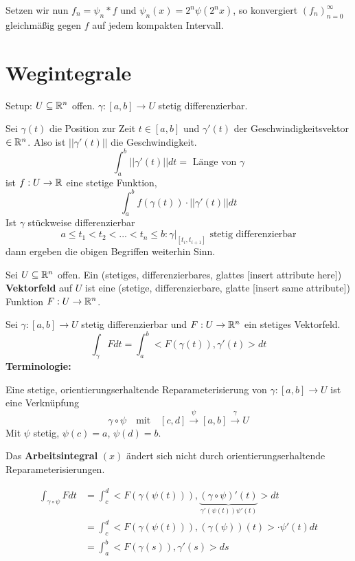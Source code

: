 \documentclass[main.tex]{subfiles}
\begin{document}
Setzen wir nun $f_n = \psi_n * f$ und $\psi_n(x) = 2^n \psi(2^n x)$, so konvergiert $(f_n)_{n = 0}^\infty$ gleichmäßig gegen $f$ auf jedem kompakten Intervall.


\section{Wegintegrale}
Setup: $U \subseteq \mathbb{R}^n$ offen. $\gamma : [a,b] \to U$ stetig differenzierbar.

Sei $\gamma(t)$ die Position zur Zeit $t \in [a,b]$ und $\gamma'(t)$ der Geschwindigkeitsvektor $\in \mathbb{R}^n$. Also ist $||\gamma'(t)||$ die Geschwindigkeit.
$$\int_a^b ||\gamma'(t)|| dt = \text{ Länge von } \gamma$$
ist $f : U \to \mathbb{R}$ eine stetige Funktion,
$$\int_a^b f(\gamma(t)) \cdot ||\gamma'(t)|| dt$$
Ist $\gamma$ stückweise differenzierbar
$$a \leq t_1 < t_2 < ... < t_n \leq b : \gamma|_{[t_i,t_{i+1}]} \text{ stetig differenzierbar}$$
dann ergeben die obigen Begriffen weiterhin Sinn.

\begin{Definition}[Vektorfeld]
  Sei $U \subseteq \mathbb{R}^n$ offen. Ein (stetiges, differenzierbares, glattes [insert attribute here]) \textbf{Vektorfeld} auf $U$ ist eine (stetige, differenzierbare, glatte [insert same attribute]) Funktion $F:U \to \mathbb{R}^n$.

  Sei $\gamma:[a,b] \to U$ stetig differenzierbar und $F: U \to \mathbb{R}^n$ ein stetiges Vektorfeld.
  $$\int_\gamma F dt = \int_a^b <F(\gamma(t)),\gamma'(t)> dt$$
  \textbf{Terminologie:}

  Eine stetige, orientierungserhaltende Reparameterisierung von $\gamma : [a,b] \to U$ ist eine Verknüpfung
  $$\gamma \circ \psi \quad \text{mit} \quad [c,d] \stackrel{\psi}{\longrightarrow} [a,b] \stackrel{\gamma}{\longrightarrow} U$$
  Mit $\psi$ stetig, $\psi(c) = a$, $\psi(d) = b$.
\end{Definition}

\begin{Theorem}[Arbeitsintegral]
  Das \textbf{Arbeitsintegral} $(x)$ ändert sich nicht durch orientierungserhaltende Reparameterisierungen.
\end{Theorem}

\begin{Beweis}
  $$\begin{aligned}
    \int_{\gamma \circ \psi} F dt & = \int_c^d <F(\gamma(\psi(t))), \underbrace{(\gamma \circ \psi)'(t)}_{\gamma'(\psi(t))\psi'(t)}> dt \\
    & = \int_c^d <F(\gamma(\psi(t))), (\gamma(\psi))(t)> \cdot \psi'(t) dt \\
    & = \int_a^b <F(\gamma(s)),\gamma'(s)> ds
  \end{aligned}$$
\end{Beweis}
\end{document}
